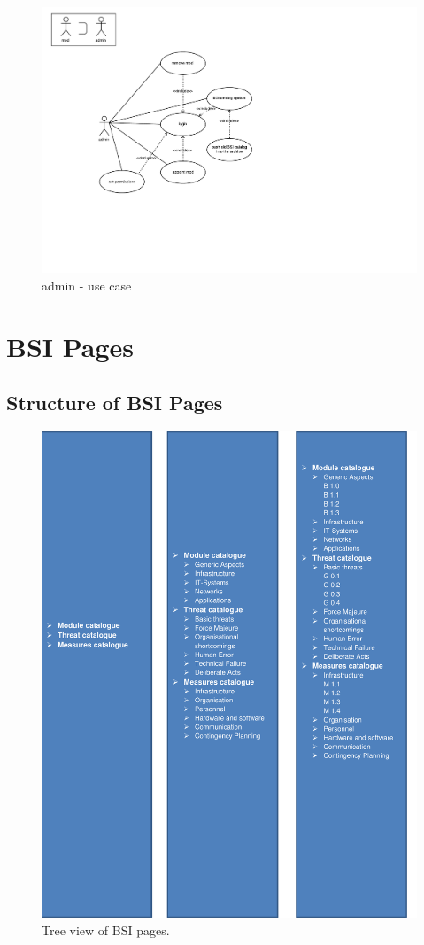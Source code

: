 \begin{figure}[h]  
    \centering
    \includegraphics[scale=1.0]{Pictures/Admin}
    \caption{admin - use case}
\end{figure}
 

\chapter{BSI Pages}

\section{Structure of BSI Pages}
\label{appendix_bsi}

\begin{figure}[h]  
    \centering
    \includegraphics[page=1,width=.8\textwidth]{Pictures/bsi_pages.pdf}
    \caption{Tree view of BSI pages.}
\end{figure}

